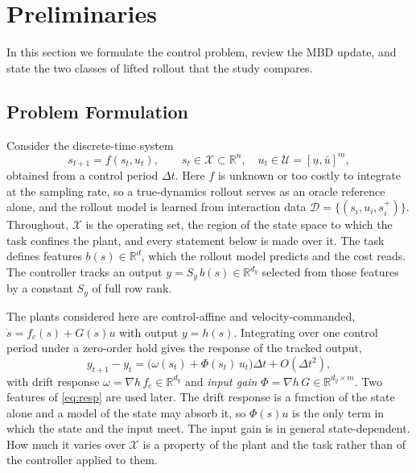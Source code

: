 \documentclass[letterpaper,10pt,conference]{ieeeconf}
\begin{document}
\section{Preliminaries}\label{sec:prelim}

In this section we formulate the control problem, review the MBD update, and state the two classes of lifted rollout that the study compares.

\subsection{Problem Formulation}\label{subsec:problem}

Consider the discrete-time system
\begin{equation}
s_{t+1} = f(s_t, u_t), \qquad
s_t \in \mathcal{X} \subset \mathbb{R}^{n},\quad
u_t \in \mathcal{U} = [\underline{u}, \bar{u}]^{m},
\label{eq:sys}
\end{equation}
obtained from a control period $\Delta t$.
Here $f$ is unknown or too costly to integrate at the sampling rate, so a true-dynamics rollout serves as an oracle reference alone, and the rollout model is learned from interaction data $\mathcal{D} = \{(s_i, u_i, s_i^{+})\}$.
Throughout, $\mathcal{X}$ is the operating set, the region of the state space to which the task confines the plant, and every statement below is made over it.
The task defines features $b(s) \in \mathbb{R}^{d}$, which the rollout model predicts and the cost reads.
The controller tracks an output $y = S_y\, b(s) \in \mathbb{R}^{d_y}$ selected from those features by a constant $S_y$ of full row rank.

The plants considered here are control-affine and velocity-commanded, $\dot{s} = f_c(s) + G(s)u$ with output $y = h(s)$.
Integrating over one control period under a zero-order hold gives the response of the tracked output,
\begin{equation}
y_{t+1} - y_t = \big(\omega(s_t) + \Phi(s_t)\, u_t\big)\Delta t + O(\Delta t^{2}),
\label{eq:resp}
\end{equation}
with drift response $\omega = \nabla h\, f_c \in \mathbb{R}^{d_y}$ and \emph{input gain} $\Phi = \nabla h\, G \in \mathbb{R}^{d_y \times m}$.
Two features of \eqref{eq:resp} are used later.
The drift response is a function of the state alone and a model of the state may absorb it, so $\Phi(s)u$ is the only term in which the state and the input meet.
The input gain is in general state-dependent.
How much it varies over $\mathcal{X}$ is a property of the plant and the task rather than of the controller applied to them.
\end{document}
